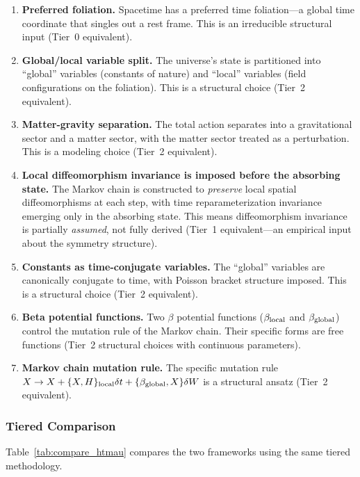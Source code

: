 \documentclass[aps,prd,twocolumn,showpacs,superscriptaddress,preprintnumbers]{revtex4-2}
\begin{document}
\begin{enumerate}
    \item \textbf{Preferred foliation.} Spacetime has a preferred time foliation---a global time coordinate that singles out a rest frame. This is an irreducible structural input (Tier~0 equivalent).
    \item \textbf{Global/local variable split.} The universe's state is partitioned into ``global'' variables (constants of nature) and ``local'' variables (field configurations on the foliation). This is a structural choice (Tier~2 equivalent).
    \item \textbf{Matter-gravity separation.} The total action separates into a gravitational sector and a matter sector, with the matter sector treated as a perturbation. This is a modeling choice (Tier~2 equivalent).
    \item \textbf{Local diffeomorphism invariance is imposed before the absorbing state.} The Markov chain is constructed to \emph{preserve} local spatial diffeomorphisms at each step, with time reparameterization invariance emerging only in the absorbing state. This means diffeomorphism invariance is partially \emph{assumed}, not fully derived (Tier~1 equivalent---an empirical input about the symmetry structure).
    \item \textbf{Constants as time-conjugate variables.} The ``global'' variables are canonically conjugate to time, with Poisson bracket structure imposed. This is a structural choice (Tier~2 equivalent).
    \item \textbf{Beta potential functions.} Two $\beta$ potential functions ($\beta_{\rm local}$ and $\beta_{\rm global}$) control the mutation rule of the Markov chain. Their specific forms are free functions (Tier~2 structural choices with continuous parameters).
    \item \textbf{Markov chain mutation rule.} The specific mutation rule $X\to X+\{X,H\}_{\rm local}\delta t + \{\beta_{\rm global},X\}\delta W$ is a structural ansatz (Tier~2 equivalent).
\end{enumerate}

\subsubsection{Tiered Comparison}

Table~\ref{tab:compare_htmau} compares the two frameworks using the same tiered methodology.
\end{document}
